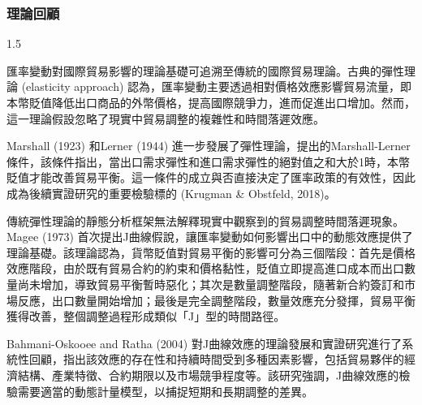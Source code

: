 \documentclass[a4paper,12pt]{article}
\begin{document}
\subsubsection{理論回顧}
\begin{spacing}{1.5}

匯率變動對國際貿易影響的理論基礎可追溯至傳統的國際貿易理論。古典的彈性理論 (elasticity approach) 認為，匯率變動主要透過相對價格效應影響貿易流量，即本幣貶值降低出口商品的外幣價格，提高國際競爭力，進而促進出口增加。然而，這一理論假設忽略了現實中貿易調整的複雜性和時間落遲效應。

Marshall (1923) 和Lerner (1944) 進一步發展了彈性理論，提出的Marshall-Lerner條件，該條件指出，當出口需求彈性和進口需求彈性的絕對值之和大於1時，本幣貶值才能改善貿易平衡。這一條件的成立與否直接決定了匯率政策的有效性，因此成為後續實證研究的重要檢驗標的 (Krugman \& Obstfeld, 2018)。

傳統彈性理論的靜態分析框架無法解釋現實中觀察到的貿易調整時間落遲現象。Magee (1973) 首次提出J曲線假說，讓匯率變動如何影響出口中的動態效應提供了理論基礎。該理論認為，貨幣貶值對貿易平衡的影響可分為三個階段：首先是價格效應階段，由於既有貿易合約的約束和價格黏性，貶值立即提高進口成本而出口數量尚未增加，導致貿易平衡暫時惡化；其次是數量調整階段，隨著新合約簽訂和市場反應，出口數量開始增加；最後是完全調整階段，數量效應充分發揮，貿易平衡獲得改善，整個調整過程形成類似「J」型的時間路徑。

Bahmani-Oskooee and Ratha (2004) 對J曲線效應的理論發展和實證研究進行了系統性回顧，指出該效應的存在性和持續時間受到多種因素影響，包括貿易夥伴的經濟結構、產業特徵、合約期限以及市場競爭程度等。該研究強調，J曲線效應的檢驗需要適當的動態計量模型，以捕捉短期和長期調整的差異。

\end{spacing}
\end{document}
